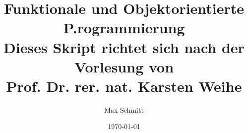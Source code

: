 \documentclass[a4paper,12pt,liststotoc, parskip=half]{scrreprt}
\begin{document}
    \pagestyle{fancy}

    \title{
      Funktionale und Objektorientierte P.rogrammierung\\
      \large Dieses Skript richtet sich nach der Vorlesung von \\ Prof. Dr. rer. nat. Karsten Weihe}

    \date{\today}
    \author{Max Schmitt}
    \maketitle
    \pagestyle{fancy}
    \lhead{ }
    \chead{\leftmark}
    \rhead{}

    \cfoot{\thepage}
    \rfoot{ %
    \date{\today} }

    \begingroup
      \renewcommand*{\chapterpagestyle}{empty}
      \pagestyle{empty}
      \tableofcontents
    \endgroup


    \clearpage

    

    \appendix

    
\end{document}
